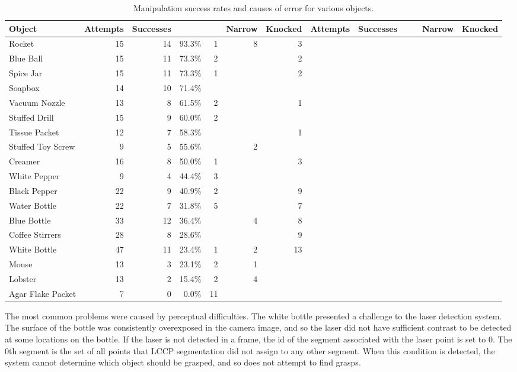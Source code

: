 \documentclass[letterpaper, 10 pt, conference]{ieeeconf}
\begin{document}
\begin{table*}[t]
	\begin{tabular}{l r r r r r r r r r r r r}
		Object & Attempts & Successes & \vbox{\hbox{\strut Percent}\hbox{\strut Success}} & \vbox{\hbox{\strut Bad}\hbox{\strut Points}} & Narrow & Knocked & Attempts & Successes & \vbox{\hbox{\strut Percent}\hbox{\strut Success}} & \vbox{\hbox{\strut Bad}\hbox{\strut Points}} & Narrow & Knocked \\
		\hline 
		Rocket & 15 & 14 & 93.3\% & 1 & 8 & 3 & & & & & &\\
		Blue Ball & 15 & 11 & 73.3\% & 2 & & 2 & & & & & &\\
		Spice Jar & 15 & 11 & 73.3\% & 1 & & 2 & & & & & &\\
		Soapbox & 14 & 10 & 71.4\% & & & & & & & & & \\
		Vacuum Nozzle & 13 & 8 & 61.5\% & 2 & & 1 & & & & & & \\
		Stuffed Drill & 15 & 9 & 60.0\% & 2 & & & & & & & & \\
		Tissue Packet & 12 & 7 & 58.3\% & & & 1 & & & & & & \\
		Stuffed Toy Screw & 9 & 5 & 55.6\%  & & 2 & & & & & & & \\
		Creamer & 16 & 8 & 50.0\% & 1 & & 3 & & & & & & \\
		White Pepper & 9 & 4 & 44.4\% & 3 & & & & & & & & \\
		Black Pepper & 22 & 9 & 40.9\% & 2 & & 9 & & & & & & \\
		Water Bottle & 22 & 7 & 31.8\% & 5 & & 7 & & & & & & \\
		Blue Bottle & 33 & 12 & 36.4\% & & 4 & 8 & & & & & & \\
		Coffee Stirrers & 28 & 8 & 28.6\% & & & 9 & & & & & & \\
		White Bottle & 47 & 11 & 23.4\% & 1 & 2 & 13 & & & & & & \\
		Mouse & 13 & 3 & 23.1\% & 2 & 1 & & & & & & & \\
		Lobster & 13 & 2 & 15.4\% & 2 & 4 & & & & & & & \\
		Agar Flake Packet & 7 & 0 & 0.0\% & 11 & & & & & & & & \\
	\end{tabular}
	\caption{Manipulation success rates and causes of error for various objects.}
	\label{tab:success_rates}
\end{table*}

The most common problems were caused by perceptual difficulties. 
The white bottle presented a challenge to the laser detection system. 
The surface of the bottle was consistently overexposed in the camera image, and so the laser did not have sufficient contrast to be detected at some locations on the bottle. 
If the laser is not detected in a frame, the id of the segment associated with the laser point is set to 0. 
The 0th segment is the set of all points that LCCP segmentation did not assign to any other segment. 
When this condition is detected, the system cannot determine which object should be grasped, and so does not attempt to find grasps. 
\end{document}
